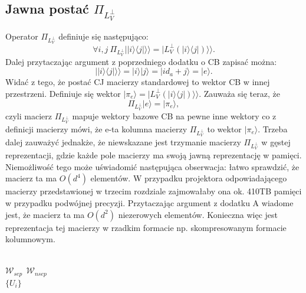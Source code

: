 \documentclass[10pt]{article} %
\newcommand{\Ket}[1]{|#1\rangle}
\newcommand{\Bra}[1]{\langle#1|}
\newcommand{\KKet}[1]{|#1\rangle\rangle}
\newcommand{\LPV}{{L^\perp_V}}
\begin{document}
\begin{appendices}
\section{Jawna postać $\Pi_\LPV$}
Operator $\Pi_\LPV$ definiuje się następująco:
\begin{equation}
\forall i,j~\Pi_\LPV \KKet{\Ket{i}\Bra{j}} = \KKet{\LPV(\Ket{i}\Bra{j})}.
\end{equation}
Dalej przytaczając argument z poprzedniego dodatku o CB zapisać można:
\begin{equation}
\KKet{\Ket{i}\Bra{j}} = \Ket{i}\Ket{j} = \Ket{i d_a + j} = \Ket{e}.
\end{equation} Widać z tego, że postać CJ macierzy standardowej to wektor CB w innej przestrzeni.
Definiuje się wektor $\Ket{\pi_{e}} = \KKet{\LPV(\Ket{i}\Bra{j})}$. Zauważa się teraz, że 
\begin{equation}
\Pi_\LPV \Ket{e} = \Ket{\pi_{e}},
\end{equation} czyli macierz $\Pi_\LPV$ mapuje wektory bazowe CB na pewne inne wektory co z definicji macierzy mówi, że e-ta kolumna macierzy $\Pi_\LPV$ to wektor $\Ket{\pi_{e}}$.
Trzeba dalej zauważyć jednakże, że niewskazane jest trzymanie macierzy $\Pi_\LPV$ w gęstej reprezentacji, gdzie każde pole macierzy ma swoją jawną reprezentację w pamięci.
Niemożliwość tego może uświadomić następująca obserwacja: łatwo sprawdzić, że macierz ta ma $O(d^4)$ elementów. W przypadku projektora odpowiadającego macierzy przedstawionej w trzecim rozdziale zajmowałaby ona ok. 410TB pamięci w przypadku podwójnej precyzji.
Przytaczając argument z dodatku A wiadome jest, że macierz ta ma $O(d^2)$ niezerowych elementów. Konieczna więc jest reprezentacja tej macierzy w rzadkim formacie np. skompresowanym formacie kolumnowym.
\end{appendices}
\\
$\mathcal{W}_{sep}~~\mathcal{W}_{nsep}$\\
$\{ U_i\}$
\end{document}
